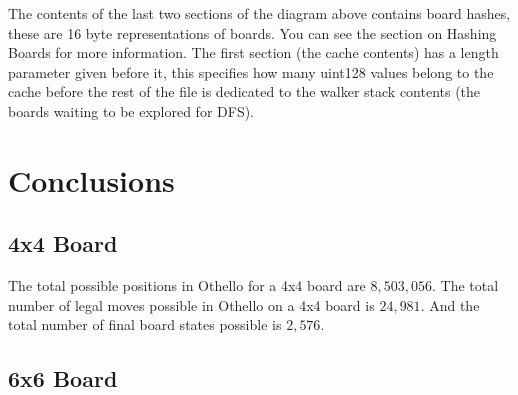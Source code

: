\documentclass{article}
\begin{document}
The contents of the last two sections of the diagram above contains board hashes, these are 16 byte representations of boards. You can see the section on Hashing Boards for more information. The first section (the cache contents) has a length parameter given before it, this specifies how many uint128 values belong to the cache before the rest of the file is dedicated to the walker stack contents (the boards waiting to be explored for DFS).

\newpage

\section{Conclusions}

\subsection{4x4 Board}

The total possible positions in Othello for a 4x4 board are $8,503,056$.\cite{wiki} The total number of legal moves possible in Othello on a 4x4 board is $24,981$. And the total number of final board states possible is $2,576$.

\subsection{6x6 Board}



\newpage
\printbibliography[title={Bibliography}]
\end{document}
